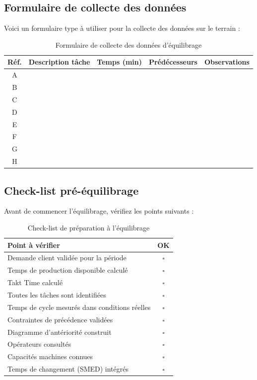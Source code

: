 \documentclass[12pt,a4paper]{article}
\begin{document}
\subsection{Formulaire de collecte des données}

Voici un formulaire type à utiliser pour la collecte des données sur le terrain :

\begin{table}[H]
\centering
\begin{tabular}{|c|p{3cm}|p{2cm}|p{2.5cm}|p{3cm}|}
\hline
\textbf{Réf.} & \textbf{Description tâche} & \textbf{Temps (min)} & \textbf{Prédécesseurs} & \textbf{Observations} \\
\hline
A & & & & \\
\hline
B & & & & \\
\hline
C & & & & \\
\hline
D & & & & \\
\hline
E & & & & \\
\hline
F & & & & \\
\hline
G & & & & \\
\hline
H & & & & \\
\hline
\end{tabular}
\caption{Formulaire de collecte des données d'équilibrage}
\end{table}

\subsection{Check-list pré-équilibrage}

Avant de commencer l'équilibrage, vérifiez les points suivants :

\begin{table}[H]
\centering
\begin{tabular}{|p{8cm}|c|}
\hline
\textbf{Point à vérifier} & \textbf{OK} \\
\hline
Demande client validée pour la période & $\square$ \\
\hline
Temps de production disponible calculé & $\square$ \\
\hline
Takt Time calculé & $\square$ \\
\hline
Toutes les tâches sont identifiées & $\square$ \\
\hline
Temps de cycle mesurés dans conditions réelles & $\square$ \\
\hline
Contraintes de précédence validées & $\square$ \\
\hline
Diagramme d'antériorité construit & $\square$ \\
\hline
Opérateurs consultés & $\square$ \\
\hline
Capacités machines connues & $\square$ \\
\hline
Temps de changement (SMED) intégrés & $\square$ \\
\hline
\end{tabular}
\caption{Check-list de préparation à l'équilibrage}
\end{table}
\end{document}

